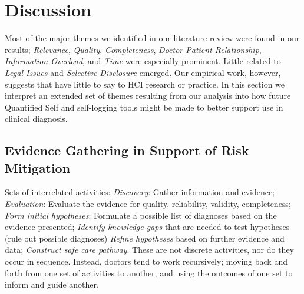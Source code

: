 \documentclass{sigchi}
\begin{document}



\section{Discussion}

Most of the major themes we identified in our literature review were found in our results; \emph{Relevance}, \emph{Quality}, \emph{Completeness}, \emph{Doctor-Patient Relationship}, \emph{Information Overload}, and \emph{Time} were especially prominent. Little related to \emph{Legal Issues} and \emph{Selective Disclosure} emerged. Our empirical work, however, suggests that have little to say to HCI research or practice. In this section we interpret an extended set of  themes resulting from our analysis into how future Quantified Self and self-logging tools might be made to better support use in clinical diagnosis. %


\subsection{Evidence Gathering in Support of Risk Mitigation} %
\label{sec:riskmit}

Sets of interrelated activities: \emph{Discovery}: Gather information and evidence; \emph{Evaluation}: Evaluate the evidence for quality, reliability, validity, completeness; \emph{Form initial hypotheses}: Formulate a possible list of diagnoses based on the evidence presented; \emph{Identify knowledge gaps} that are needed to test hypotheses (rule out possible diagnoses) \emph{Refine hypotheses} based on further evidence and data; \emph{Construct safe care pathway}.  These are not discrete activities, nor do they occur in sequence.  Instead, doctors tend to work recursively; moving back and forth from one set of activities to another, and using the outcomes of one set to inform and guide another.
\end{document}
